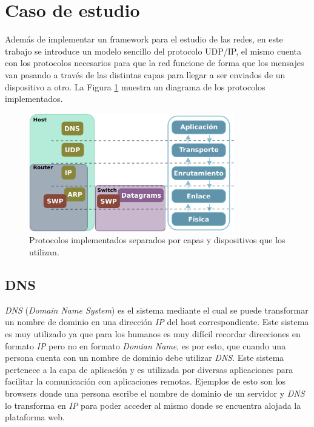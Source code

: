 \documentclass[10pt,a4paper]{article}
\begin{document}
\section{Caso de estudio}
	Además de implementar un framework para el estudio de las redes, en este trabajo se introduce un modelo sencillo del protocolo UDP/IP, el mismo cuenta con los protocolos necesarios para que la red funcione de forma que los mensajes van pasando a través de las distintas capas para llegar a ser enviados de un dispositivo a otro. La Figura \ref{figure: protocolos} muestra un diagrama de los protocolos implementados. \\

\begin{figure}[!htb]
    \centering
    \includegraphics[width = 0.8\textwidth]{img/png/protocols.png}
    \caption{Protocolos implementados separados por capas y dispositivos que los utilizan.}
    \label{figure: protocolos}
\end{figure}
	
\subsection{DNS}
\textit{DNS} (\textit{Domain Name System}) es el sistema mediante el cual se puede transformar un nombre de dominio en una dirección \textit{IP} del host correspondiente. Este sistema es muy utilizado ya que para los humanos es muy difícil recordar direcciones en formato \textit{IP} pero no en formato \textit{Domian Name}, es por esto, que cuando una persona cuenta con un nombre de dominio debe utilizar \textit{DNS}. Este sistema pertenece a la capa de aplicación y es utilizada por diversas aplicaciones para facilitar la comunicación con aplicaciones remotas. Ejemplos de esto son los browsers donde una persona escribe el nombre de dominio de un servidor y \textit{DNS} lo transforma en \textit{IP} para poder acceder al mismo donde se encuentra alojada la plataforma web. 
\end{document}
